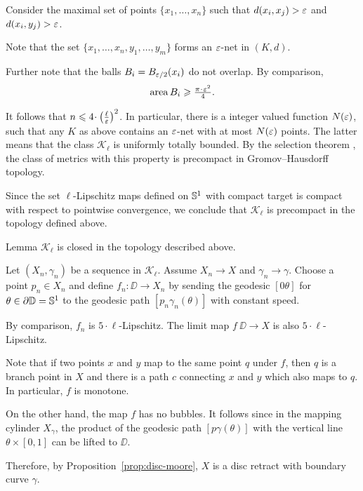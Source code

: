 Consider the maximal set of points $\{x_1,\dots,x_n\}$ such that $d(x_i,x_j)>\varepsilon$ and $d(x_i,y_j)>\varepsilon$.

Note that the set $\{x_1,\dots,x_n,y_1,\dots,y_m\}$
forms an $\varepsilon$-net in $(K,d)$.

Further note that the balls $B_i=B_{\varepsilon/2}(x_i)$
do not overlap.
By comparison,
\[\area B_i\ge \tfrac{\pi\cdot\eps^2}{4}.\]

It follows that $n\le 4\cdot\left(\tfrac\ell\eps\right)^2$.
In particular, there is a integer valued function $N(\varepsilon)$, such that any  
$K$ as above contains an $\varepsilon$-net
with at most $N(\varepsilon)$ points.
The latter means that the class $\mathcal{K}_\ell$ is uniformly totally bounded.
By the selection theorem \cite[7.4.15]{BBI}, the class of metrics with this property is precompact in Gromov--Hausdorff topology.

Since the set $\ell$-Lipschitz maps defined on $\mathbb{S}^1$ with compact target is compact with respect to pointwise convergence, we conclude that $\mathcal{K}_\ell$ is precompact in the topology defined above. 
\qeds





\begin{thm}{Lemma}\label{lem:closed}
$\mathcal{K}_\ell$ is closed in the topology described above.
\end{thm}

Let $(X_n,\gamma_n)$ be a sequence in $\mathcal{K}_\ell$.
Assume $X_n\to X$ and $\gamma_n\to\gamma$. 
Choose a point $p_n\in X_n$ and define
$f_n:\DD\to X_n$ by sending the geodesic $[0\theta]$ for $\theta\in\partial \mathbb{D}=\mathbb{S}^1$ to the geodesic path $[p_n\gamma_n(\theta)]$ with constant speed. 

By comparison, $f_n$ is $5\cdot\ell$-Lipschitz. %
The limit map $f\:\DD\to X$ is also $5\cdot\ell$-Lipschitz.

Note that if two points $x$  and $y$ map to the same point $q$ under $f$, then $q$ is a branch point in $X$ and there is a path $c$ connecting 
$x$ and $y$ which also maps to $q$. 
In particular, $f$ is monotone.

On the other hand, the map $f$ has no bubbles.
It follows since in the mapping cylinder $X_\gamma$, the product of the geodesic path $[p\gamma(\theta)]$ with the vertical line $\theta\times [0,1]$ can be lifted to $\DD$.

Therefore, by Proposition~\ref{prop:disc-moore}, $X$ is a disc retract with boundary curve $\gamma$.
\qeds
